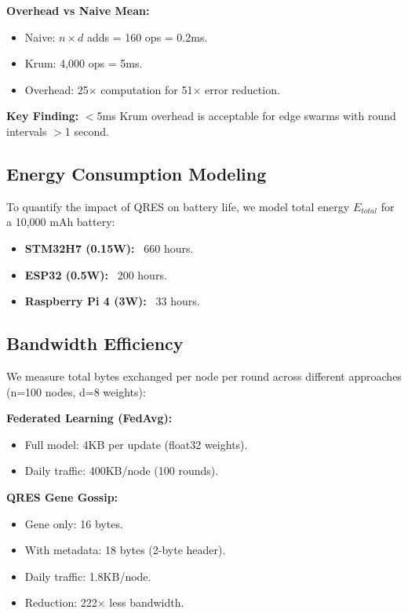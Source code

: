 \documentclass[conference,10pt]{IEEEtran}
\begin{document}
\textbf{Overhead vs Naive Mean:}
\begin{itemize}
    \item Naive: $n \times d$ adds = 160 ops = 0.2ms.
    \item Krum: 4,000 ops = 5ms.
    \item Overhead: 25$\times$ computation for 51$\times$ error reduction.
\end{itemize}

\textbf{Key Finding:} $<$5ms Krum overhead is acceptable for edge swarms with round intervals $>$1 second.

\subsection{Energy Consumption Modeling}
To quantify the impact of QRES on battery life, we model total energy $E_{total}$ for a 10,000 mAh battery:
\begin{itemize}
    \item \textbf{STM32H7 (0.15W):} ~660 hours.
    \item \textbf{ESP32 (0.5W):} ~200 hours.
    \item \textbf{Raspberry Pi 4 (3W):} ~33 hours.
\end{itemize}

\subsection{Bandwidth Efficiency}

We measure total bytes exchanged per node per round across different approaches (n=100 nodes, d=8 weights):

\textbf{Federated Learning (FedAvg):}
\begin{itemize}
    \item Full model: 4KB per update (float32 weights).
    \item Daily traffic: 400KB/node (100 rounds).
\end{itemize}

\textbf{QRES Gene Gossip:}
\begin{itemize}
    \item Gene only: 16 bytes.
    \item With metadata: 18 bytes (2-byte header).
    \item Daily traffic: 1.8KB/node.
    \item Reduction: 222$\times$ less bandwidth.
\end{itemize}
\end{document}

